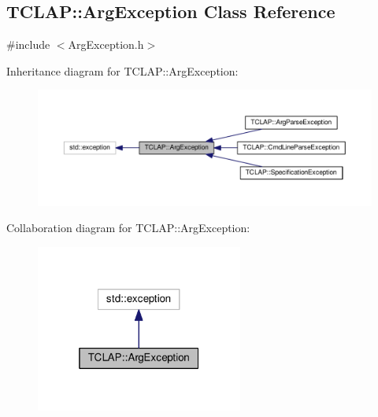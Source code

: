 \hypertarget{classTCLAP_1_1ArgException}{}\subsection{T\+C\+L\+AP\+:\+:Arg\+Exception Class Reference}
\label{classTCLAP_1_1ArgException}


{\ttfamily \#include $<$Arg\+Exception.\+h$>$}



Inheritance diagram for T\+C\+L\+AP\+:\+:Arg\+Exception\+:
\nopagebreak
\begin{figure}[H]
\begin{center}
\leavevmode
\includegraphics[width=350pt]{classTCLAP_1_1ArgException__inherit__graph}
\end{center}
\end{figure}


Collaboration diagram for T\+C\+L\+AP\+:\+:Arg\+Exception\+:
\nopagebreak
\begin{figure}[H]
\begin{center}
\leavevmode
\includegraphics[width=193pt]{classTCLAP_1_1ArgException__coll__graph}
\end{center}
\end{figure}
